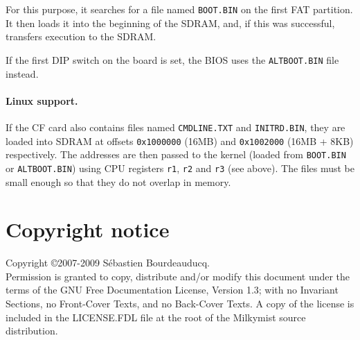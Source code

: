 \documentclass[a4paper,11pt]{article}
\begin{document}
For this purpose, it searches for a file named \verb!BOOT.BIN! on the first FAT partition. It then loads it into the beginning of the SDRAM, and, if this was successful, transfers execution to the SDRAM.

If the first DIP switch on the board is set, the BIOS uses the \verb!ALTBOOT.BIN! file instead.

\paragraph{Linux support.} If the CF card also contains files named \verb!CMDLINE.TXT! and \verb!INITRD.BIN!, they are loaded into SDRAM at offsets \verb!0x1000000! (16MB) and \verb!0x1002000! (16MB + 8KB) respectively. The addresses are then passed to the kernel (loaded from \verb!BOOT.BIN! or \verb!ALTBOOT.BIN!) using CPU registers \verb!r1!, \verb!r2! and \verb!r3! (see above). The files must be small enough so that they do not overlap in memory.

\section*{Copyright notice}
Copyright \copyright 2007-2009 S\'ebastien Bourdeauducq. \\
Permission is granted to copy, distribute and/or modify this document under the terms of the GNU Free Documentation License, Version 1.3; with no Invariant Sections, no Front-Cover Texts, and no Back-Cover Texts. A copy of the license is included in the LICENSE.FDL file at the root of the Milkymist source distribution.
\end{document}
